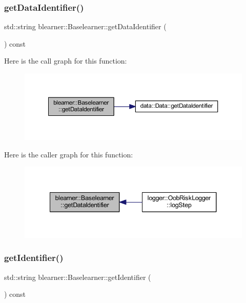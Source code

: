 \subsubsection{\texorpdfstring{get\+Data\+Identifier()}{getDataIdentifier()}}
{\footnotesize\ttfamily std\+::string blearner\+::\+Baselearner\+::get\+Data\+Identifier (\begin{DoxyParamCaption}{ }\end{DoxyParamCaption}) const}

Here is the call graph for this function\+:
\nopagebreak
\begin{figure}[H]
\begin{center}
\leavevmode
\includegraphics[width=350pt]{classblearner_1_1_baselearner_a2393dc1e3cf90919ebbbd237fe303860_cgraph}
\end{center}
\end{figure}
Here is the caller graph for this function\+:
\nopagebreak
\begin{figure}[H]
\begin{center}
\leavevmode
\includegraphics[width=341pt]{classblearner_1_1_baselearner_a2393dc1e3cf90919ebbbd237fe303860_icgraph}
\end{center}
\end{figure}
\mbox{\label{classblearner_1_1_baselearner_aa10fa4301aeb37f6e8c18457541c3be7}} 
\subsubsection{\texorpdfstring{get\+Identifier()}{getIdentifier()}}
{\footnotesize\ttfamily std\+::string blearner\+::\+Baselearner\+::get\+Identifier (\begin{DoxyParamCaption}{ }\end{DoxyParamCaption}) const}


